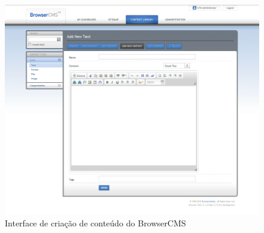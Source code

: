 \begin{figure}[here]
\includegraphics[width=150mm]{images/browser_cms_new_content.jpg}
\caption{Interface de criação de conteúdo do BrowserCMS}
\label{fig:browsercms_new_content}
\end{figure}


